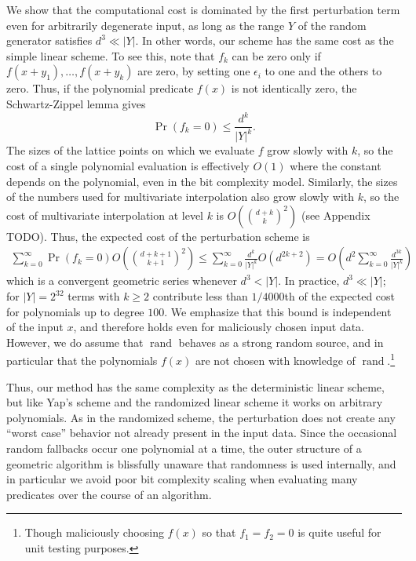 \documentclass[11pt]{article}
\newcommand{\rand}{\operatorname{rand}}
\newcommand{\TODO}{{\color{red} TODO}}
\begin{document}
We show that the computational cost is dominated by the first perturbation term even for arbitrarily degenerate input, as long as the range $Y$ of the random generator
satisfies $d^3 \ll |Y|$.  In other words, our scheme has the same cost as the simple linear scheme.  To see this, note that $f_k$ can be zero only if $f(x + y_1), \ldots, f(x + y_k)$ are zero,
by setting one $\epsilon_i$ to one and the others to zero.  Thus, if the polynomial predicate $f(x)$ is not identically zero, the Schwartz-Zippel lemma gives
$$\Pr(f_k = 0) \le \frac{d^k}{|Y|^k}.$$
The sizes of the lattice points on which we evaluate $f$ grow slowly with $k$, so the cost of a single polynomial evaluation is effectively $O(1)$ where the constant depends on the
polynomial, even in the bit complexity model.  Similarly, the sizes of the numbers used for multivariate interpolation also grow slowly with $k$, so the cost of multivariate
interpolation at level $k$ is $O\left(\binom{d + k}{k}^2\right)$ (see Appendix \TODO).  Thus, the expected cost of the perturbation scheme is
\begin{align} \label{cost}
\sum_{k = 0}^\infty \Pr(f_k = 0) O\left(\binom{d + k + 1}{k + 1}^2\right) \le \sum_{k = 0}^\infty \frac{d^k}{|Y|^k} O(d^{2k+2}) = O\left(d^2 \sum_{k = 0}^\infty \frac{d^{3k}}{|Y|^k} \right)
\end{align}
which is a convergent geometric series whenever $d^3 < |Y|$.  In practice, $d^3 \ll |Y|$; for $|Y| = 2^{32}$ terms with $k \ge 2$ contribute less than $1/4000$th of the expected cost
for polynomials up to degree $100$.  We emphasize that this bound is independent of the input $x$, and therefore holds even for maliciously chosen input data.  However, we do
assume that $\rand$ behaves as a strong random source, and in particular that the polynomials $f(x)$ are not chosen with knowledge of $\rand$.\footnote{Though maliciously
choosing $f(x)$ so that $f_1 = f_2 = 0$ is quite useful for unit testing purposes.}

Thus, our method has the same complexity as the deterministic linear scheme, but like Yap's scheme and the randomized linear scheme it works on arbitrary polynomials.  As in the
randomized scheme, the perturbation does not create any ``worst case'' behavior not already present in the input data.  Since the occasional random fallbacks occur one
polynomial at a time, the outer structure of a geometric algorithm is blissfully unaware that randomness is used internally, and in particular we avoid poor bit complexity
scaling when evaluating many predicates over the course of an algorithm.
\end{document}

